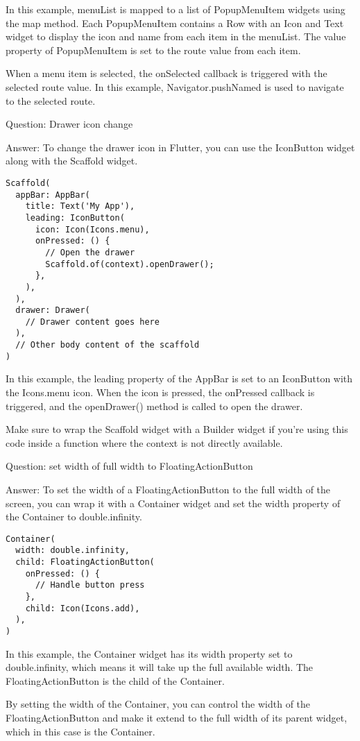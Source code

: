 In this example, menuList is mapped to a list of PopupMenuItem widgets using the map method. Each PopupMenuItem 
contains a Row with an Icon and Text widget to display the icon and name from each item in the menuList. 
The value property of PopupMenuItem is set to the route value from each item.

When a menu item is selected, the onSelected callback is triggered with the selected route value. In this example,
Navigator.pushNamed is used to navigate to the selected route.


Question: Drawer icon change

Answer: To change the drawer icon in Flutter, you can use the IconButton widget along with the Scaffold widget. 

\begin{lstlisting}
Scaffold(
  appBar: AppBar(
    title: Text('My App'),
    leading: IconButton(
      icon: Icon(Icons.menu),
      onPressed: () {
        // Open the drawer
        Scaffold.of(context).openDrawer();
      },
    ),
  ),
  drawer: Drawer(
    // Drawer content goes here
  ),
  // Other body content of the scaffold
)
\end{lstlisting}

In this example, the leading property of the AppBar is set to an IconButton with the Icons.menu icon. When the 
icon is pressed, the onPressed callback is triggered, and the openDrawer() method is called to open the drawer.

Make sure to wrap the Scaffold widget with a Builder widget if you're using this code inside a function 
where the context is not directly available.

Question: set width of full width to FloatingActionButton

Answer: To set the width of a FloatingActionButton to the full width of the screen, you can wrap it with a Container 
widget and set the width property of the Container to double.infinity.

\begin{lstlisting}
Container(
  width: double.infinity,
  child: FloatingActionButton(
    onPressed: () {
      // Handle button press
    },
    child: Icon(Icons.add),
  ),
)
\end{lstlisting}

In this example, the Container widget has its width property set to double.infinity, which means it will take up the
full available width. The FloatingActionButton is the child of the Container.

By setting the width of the Container, you can control the width of the FloatingActionButton and make it extend 
to the full width of its parent widget, which in this case is the Container.

